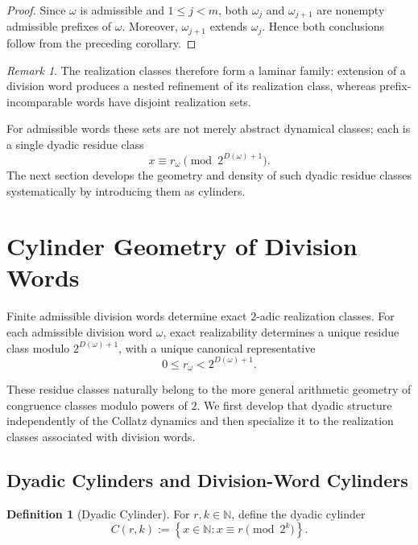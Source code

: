 \documentclass[12pt, oneside]{article}
\numberwithin{equation}{section}
\theoremstyle{definition}
\newtheorem{definition}{Definition}[section]
\theoremstyle{plain}
\theoremstyle{remark}
\newtheorem*{remark}{Remark}
\begin{document}
\begin{proof}
Since \(\omega\) is admissible and \(1\le j<m\), both
\(\omega_j\) and \(\omega_{j+1}\) are nonempty admissible prefixes of
\(\omega\). Moreover, \(\omega_{j+1}\) extends \(\omega_j\).
Hence both conclusions follow from the preceding corollary.
\end{proof}

\begin{remark}
The realization classes therefore form a laminar family: extension of a
division word produces a nested refinement of its realization class,
whereas prefix-incomparable words have disjoint realization sets.

For admissible words these sets are not merely abstract dynamical classes;
each is a single dyadic residue class
\[
x\equiv r_\omega
\pmod{2^{D(\omega)+1}}.
\]
The next section develops the geometry and density of such dyadic residue
classes systematically by introducing them as cylinders.
\end{remark}


\section{Cylinder Geometry of Division Words}
\label{sec:cylinder-geometry}

Finite admissible division words determine exact \(2\)-adic realization
classes. For each admissible division word \(\omega\), exact realizability
determines a unique residue class modulo \(2^{D(\omega)+1}\), with a unique
canonical representative
\[
0\le r_\omega<2^{D(\omega)+1}.
\]

These residue classes naturally belong to the more general arithmetic
geometry of congruence classes modulo powers of \(2\). We first develop that
dyadic structure independently of the Collatz dynamics and then specialize
it to the realization classes associated with division words.

\subsection{Dyadic Cylinders and Division-Word Cylinders}

\begin{definition}[Dyadic Cylinder]
For \(r,k\in\mathbb N\), define the dyadic cylinder
\[
C(r,k)
:=
\left\{
x\in\mathbb N :
x\equiv r\pmod{2^k}
\right\}.
\]
\end{definition}
\end{document}
